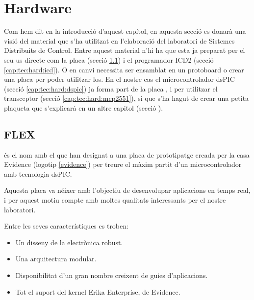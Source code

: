 \section{Hardware}\label{cap:tec:hard}

Com hem dit en la introducció d'aquest capítol, en aquesta secció es donarà una visió del material que s'ha utilitzat en l'elaboració del laboratori de Sistemes Distribuits de Control. Entre aquest material n'hi ha que esta ja preparat per el seu us directe com la placa \FLEX (secció \ref{cap:tec:hard:flex}) i el programador ICD2 (secció \ref{cap:tec:hard:icd}). O en canvi necessita ser ensamblat en un protoboard o crear una placa per poder utilitzar-los. En el nostre cas el microcontrolador dsPIC (secció \ref{cap:tec:hard:dspic}) ja forma part de la placa \FLEX, i per utilitzar el transceptor (secció \ref{cap:tec:hard:mcp2551}), si que s'ha hagut de crear una petita plaqueta que s'explicará en un altre capitol (secció \label{cap:dis:resum}).

\subsection{FLEX}\label{cap:tec:hard:flex}


\FLEX és el nom amb el que han designat a una placa de prototipatge creada per la casa Evidence (logotip \ref{evidence}) per treure el màxim partit d'un microcontrolador amb tecnologia dsPIC.

Aquesta placa va néixer amb l'objectiu de desenvolupar aplicacions en temps real, i per aquest motiu compte amb moltes qualitats interessants per el nostre laboratori.

Entre les seves característiques es troben:

\begin{itemize}
	\item Un disseny de la electrònica robust.
	\item Una arquitectura modular.
	\item Disponibilitat d'un gran nombre creixent de guies d'aplicacions.
	\item Tot el suport del kernel Erika Enterprise, de Evidence.
\end{itemize}

